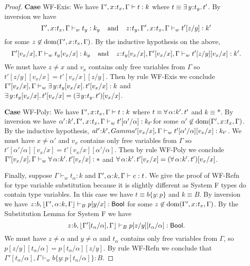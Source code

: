 \documentclass[11pt]{article}
\newcommand{\al}{\alpha}
\newcommand{\bind}{\hspace{0.05em}{:}\hspace{0.05em}} %
\newcommand{\col}{\mathbin{:}}       %
\newcommand{\Bool}{{\sf Bool}}
\newcommand{\existype}[3]{\exists\, #1\bind #2.\, #3}
\newcommand{\polytype}[3]{\forall\, #1\bind #2.\, #3}
\newcommand{\dom}[1]{{\rm dom}(#1)}
\begin{document}
\begin{proof}
{\bf Case} {\sc WF-Exis}:  We have $\Gamma', x\bind t_x,\Gamma \vdash t: k$ where $t \equiv \existype{y}{t_y}{t'}$. By inversion we have 
\begin{equation}
\Gamma', x\bind t_x,\Gamma \vdash_w t_y : k_y \;\;\;\;{\rm and}\;\;\;\; z\bind t_y,\Gamma', x\bind t_x,\Gamma \vdash_w t'[z/y] : k'
\end{equation}
for some $z\not\in\dom{\Gamma', x\bind t_x,\Gamma}$. By the inductive hypothesis on the above,
\begin{equation}
\Gamma'[v_x/x], \Gamma \vdash_w t_y[v_x/x] : k_y \;\;\;\;{\rm and}\;\;\;\;z\bind t_y[v_x/x],\Gamma'[v_x/x], \Gamma \vdash_w t'[z/y][v_x/x] : k'.
\end{equation}
We must have $z \neq x$ and $v_x$ contains only free variables from $\Gamma$ so $t'[z/y][v_x/x] = t'[v_x/x][z/y]$. Then by rule {\sc WF-Exis} we conclude $\Gamma'[v_x/x], \Gamma \vdash_w \existype{y}{t_y[v_x/x]}{t'[v_x/x]} : k$ and $\existype{y}{t_y[v_x/x]}{t'[v_x/x]} = (\existype{y}{t_y}{t'})[v_x/x]$.

{\bf Case} {\sc WF-Poly}: We have $\Gamma', x\bind t_x,\Gamma \vdash t: k$ where $t \equiv \polytype{\al}{k'}{t'}$ and $k \equiv *$. By inversion we have $\al'\bind k',\Gamma', x\bind t_x,\Gamma \vdash_w t'[\al'/\al] : k_{t'}$for some $\al'\not\in\dom{\Gamma', x\bind t_x,\Gamma}$. By the inductive hypothesis, $al'\bind k', Gamma'[v_x/x], \Gamma \vdash_w t'[\al'/\al][v_x/x] : k_{t'}$. We must have $x\neq\al'$ and $v_x$ contains only free variables from $\Gamma$ so $t'[\al'/\al][v_x/x] = t'[v_x/x][\al'/\al]$. Then by rule {\sc WF-Poly} we conclude $\Gamma'[v_x/x], \Gamma \vdash_w \polytype{\al}{k'}{t'[v_x/x]} : *$ and $\polytype{\al}{k'}{t'[v_x/x]} = (\polytype{\al}{k'}{t'})[v_x/x]$.

Finally, suppose $\Gamma \vdash_w t_\al : k$ and $\Gamma',\al\bind k,\Gamma \vdash e : t$. We give the proof of {\sc WF-Refn} for type variable substitution because it is slightly different as System F types do contain type variables. 
In this case we have $t \equiv b\{y\col p\}$ and $k \equiv B$. By inversion we have $z\bind b, \lfloor \Gamma',\al\bind k,\Gamma\rfloor \vdash_B p[y/x] : \Bool$ for some $z\not\in\dom{\Gamma',x\bind t_x,\Gamma}$. By the Substitution Lemma for System F we have 
\[
z\bind b, \lfloor \Gamma'[t_\al/\al] , \Gamma\rfloor \vdash_B p[z/y][t_\al/\al] : \Bool.
\]
We must have $z\neq \al$ and $y\neq \al$ and $t_\al$ contains only free variables from $\Gamma$, so $p[z/y][t_\al/\al] = p[t_\al/\al][z/y]$. By rule {\sc WF-Refn} we conclude that $\Gamma'[t_\al/\al], \Gamma \vdash_w b\{y\col p[t_\al/\al]\} : B$.


\end{proof}
\end{document}
